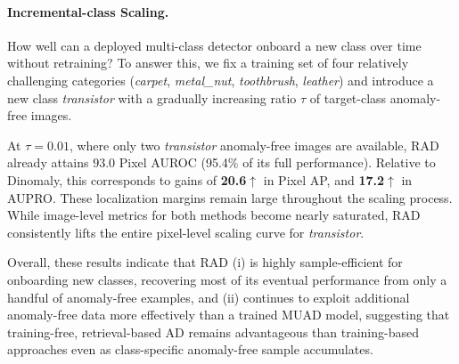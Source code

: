 \documentclass{article}
\theoremstyle{plain}
\theoremstyle{definition}
\theoremstyle{remark}
\begin{document}
\paragraph{Incremental-class Scaling.}
How well can a deployed multi-class detector onboard a new class over time without retraining? To answer this, we fix a training set of four relatively challenging categories (\textit{carpet}, \textit{metal\_nut}, \textit{toothbrush}, \textit{leather}) and introduce a new class \textit{transistor} with a gradually increasing ratio $\tau$ of target-class anomaly-free images. 

At $\tau{=}0.01$, where only two \textit{transistor} anomaly-free images are available, RAD already attains $93.0$ Pixel AUROC (95.4\% of its full performance). Relative to Dinomaly, this corresponds to gains of \textbf{20.6$\uparrow$} in Pixel AP, and \textbf{17.2$\uparrow$} in AUPRO. These localization margins remain large throughout the scaling process. While image-level metrics for both methods become nearly saturated, RAD consistently lifts the entire pixel-level scaling curve for \textit{transistor}.


Overall, these results indicate that RAD (i) is highly sample-efficient for onboarding new classes, recovering most of its eventual performance from only a handful of anomaly-free examples, and (ii) continues to exploit additional anomaly-free data more effectively than a trained MUAD model, suggesting that training-free, retrieval-based AD remains advantageous than training-based approaches even as class-specific anomaly-free sample accumulates.











\end{document}
